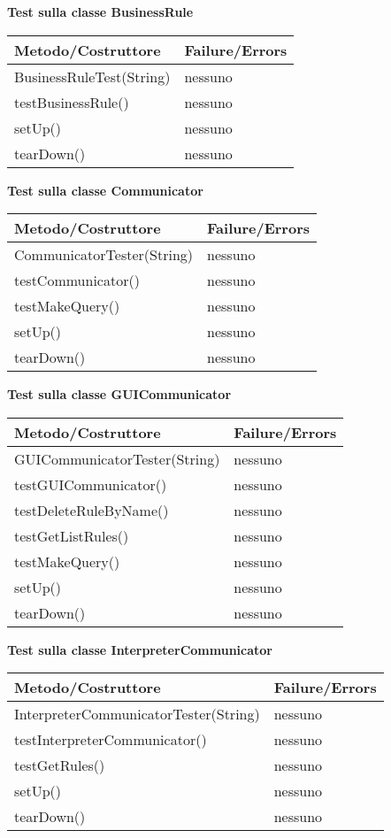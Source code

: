 \begin{center}
\textbf{Test sulla classe BusinessRule}\\
\begin{tabular}{|p{}|p{3 cm}|} \hline
\textbf{Metodo/Costruttore} & \textbf{Failure/Errors} \\ \hline
BusinessRuleTest(String) & nessuno \\ \hline
testBusinessRule() & nessuno \\ \hline
setUp() & nessuno \\ \hline
tearDown() & nessuno \\ \hline
\end{tabular}

\textbf{Test sulla classe Communicator}\\
\begin{tabular}{|p{}|p{3 cm}|} \hline
\textbf{Metodo/Costruttore} & \textbf{Failure/Errors} \\ \hline
CommunicatorTester(String) & nessuno \\ \hline
testCommunicator() & nessuno \\ \hline
testMakeQuery() & nessuno \\ \hline
setUp() & nessuno \\ \hline
tearDown() & nessuno \\ \hline
\end{tabular}

\textbf{Test sulla classe GUICommunicator}\\
\begin{tabular}{|p{}|p{3 cm}|} \hline
\textbf{Metodo/Costruttore} & \textbf{Failure/Errors} \\ \hline
GUICommunicatorTester(String) & nessuno \\ \hline
testGUICommunicator() & nessuno \\ \hline
testDeleteRuleByName() & nessuno \\ \hline
testGetListRules() & nessuno \\ \hline
testMakeQuery() & nessuno \\ \hline
setUp() & nessuno \\ \hline
tearDown() & nessuno \\ \hline
\end{tabular}

\textbf{Test sulla classe InterpreterCommunicator}\\
\begin{tabular}{|p{}|p{3 cm}|} \hline
\textbf{Metodo/Costruttore} & \textbf{Failure/Errors} \\ \hline
InterpreterCommunicatorTester(String) & nessuno \\ \hline
testInterpreterCommunicator() & nessuno \\ \hline
testGetRules() & nessuno \\ \hline
setUp() & nessuno \\ \hline
tearDown() & nessuno \\ \hline
\end{tabular}


\end{center}
